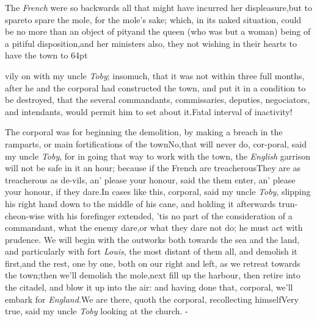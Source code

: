\documentclass{article}
\begin{document}
The \textit{French} were so backwards all that\break
{}
might have
incurred her displeasure,\tsk but to spare\tsk to spare the
mole, for the mole’s sake; which, in its naked situation,
could be no more than an object of pity\tsh and the queen
(who was but a woman) being of a pitiful
disposition,\tsk and her ministers also, they not wishing in
their hearts to have the town 
\stick{\astfill}
\hbox to 64pt{\astfill\tsh}

\noindent
\stick{\indent\astfill}
\stick{\astfill}
vily on with my uncle \textit{Toby}; insomuch, that it
was not within three full months, after he and the corporal had
constructed the town, and put it in a condition to be destroyed,
that the several commandants, commissaries, deputies, negociators,
and intendants, would permit him to set about
it.\tsh Fatal interval of inactivity!

The corporal was for beginning the demolition, by making a
breach in the ramparts, or main fortifications of the
town\tsh No,\tsk that will never do, cor-\break poral, said my
uncle \textit{Toby}, for in going that way to work with the town, the\break
\textit{English} garrison will not be safe in it an hour; because if
the French are treache\-rous\tsh They are as treacherous as de-\break vils,
an’ please your honour, said the\break
{}
\break\etp
{}
them enter, an’ please your honour, if
they dare.\tsh In cases like this, corporal, said my uncle
\textit{Toby}, slipping his\break
right hand down to the middle of his\break
cane, and holding it afterwards trun-\break 
cheon-wise with his forefinger extended,\break
\tsh ’tis no part of the consideration of a
commandant, what the enemy dare,\tsk or what they dare not do; he
must act with prudence. We will begin with the outworks both
towards the sea and the land, and particularly with fort
\textit{Louis},\break
the most distant of them all, and demolish it
first,\tsk and the rest, one by one, both on our right and left, as we retreat towards
the town;\tsh then we’ll demo\-lish the
mole,\tsk next fill up the harbour,\break
\tsk then retire into the citadel, and blow it up into the air: and
having done\break
that, corporal, we’ll embark for \textit{England.}\tsh We are there, quoth the
corporal, recollecting himself\tsh Very true, said my uncle \textit{Toby}\tsk
looking at the church.
\vfill{}\eject
\null\kern-\baselineskip
\end{document}
